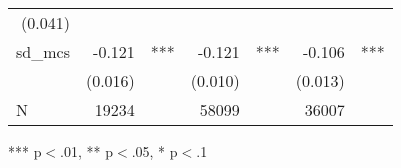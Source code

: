 \documentclass{article}
\begin{document}
\begin{table}[!h]
\begin{tabular}{lllllll}
  \multicolumn{1}{r}{(0.041)} &
  \multicolumn{1}{l}{} \\
\multicolumn{1}{l}{sd\_mcs} &
  \multicolumn{1}{r}{-0.121} &
  \multicolumn{1}{l}{***} &
  \multicolumn{1}{r}{-0.121} &
  \multicolumn{1}{l}{***} &
  \multicolumn{1}{r}{-0.106} &
  \multicolumn{1}{l}{***} \\
\multicolumn{1}{l}{} &
  \multicolumn{1}{r}{(0.016)} &
  \multicolumn{1}{l}{} &
  \multicolumn{1}{r}{(0.010)} &
  \multicolumn{1}{l}{} &
  \multicolumn{1}{r}{(0.013)} &
  \multicolumn{1}{l}{} \\
\multicolumn{1}{l}{N} &
  \multicolumn{1}{r}{19234} &
  \multicolumn{1}{l}{} &
  \multicolumn{1}{r}{58099} &
  \multicolumn{1}{l}{} &
  \multicolumn{1}{r}{36007} &
  \multicolumn{1}{l}{} \\
\cline{1-7}
\end{tabular}

\footnotesize{
*** p$<$.01, ** p$<$.05, * p$<$.1
}
\end{table}
\end{document}

